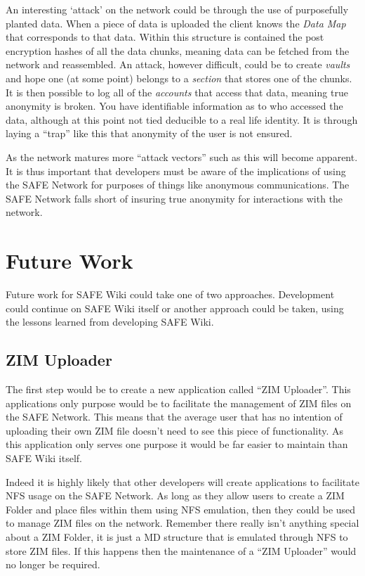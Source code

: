 An interesting `attack' on the network could be through the use of purposefully planted data. When a piece of data is uploaded the client knows the \textit{Data Map} that corresponds to that data. Within this structure is contained the post encryption hashes of all the data chunks, meaning data can be fetched from the network and reassembled. An attack, however difficult, could be to create \textit{vaults} and hope one (at some point) belongs to a \textit{section} that stores one of the chunks. It is then possible to log all of the \textit{accounts} that access that data, meaning true anonymity is broken. You have identifiable information as to who accessed the data, although at this point not tied deducible to a real life identity. It is through laying a ``trap'' like this that anonymity of the user is not ensured.

As the network matures more ``attack vectors'' such as this will become apparent. It is thus important that developers must be aware of the implications of using the SAFE Network for purposes of things like anonymous communications. The SAFE Network falls short of insuring true anonymity for interactions with the network.

\section{Future Work}

Future work for SAFE Wiki could take one of two approaches. Development could continue on SAFE Wiki itself or another approach could be taken, using the lessons learned from developing SAFE Wiki.

\subsection{ZIM Uploader}

The first step would be to create a new application called ``ZIM Uploader''. This applications only purpose would be to facilitate the management of ZIM files on the SAFE Network. This means that the average user that has no intention of uploading their own ZIM file doesn't need to see this piece of functionality. As this application only serves one purpose it would be far easier to maintain than SAFE Wiki itself.

Indeed it is highly likely that other developers will create applications to facilitate NFS usage on the SAFE Network. As long as they allow users to create a ZIM Folder and place files within them using NFS emulation, then they could be used to manage ZIM files on the network. Remember there really isn't anything special about a ZIM Folder, it is just a MD structure that is emulated through NFS to store ZIM files. If this happens then the maintenance of a ``ZIM Uploader'' would no longer be required.

